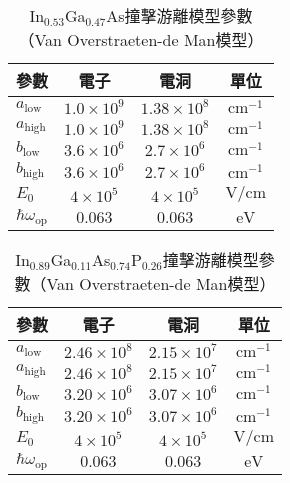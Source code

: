 \begin{table}[h]
\begin{center}
\caption[In$_{0.53}$Ga$_{0.47}$As撞擊游離模型參數]{In$_{0.53}$Ga$_{0.47}$As撞擊游離模型參數（Van Overstraeten-de Man模型）\cite{pearsall1980impact}} \label{t:ii-InGaAs-Van-Overstraeten-parameter}
\begin{tabular}{lccc}
\hline
 參數 &	電子	&	電洞		&	單位	\\
\hline
$a_\text{low}$	&	$1.0\times10^9$	&	$1.38\times10^8$	&	$\mathrm{cm}^{-1}$	\\
$a_\text{high}$	&	$1.0\times10^9$	&	$1.38\times10^8$	&	$\mathrm{cm}^{-1}$	\\
$b_\text{low}$	&	$3.6\times10^6$	&	$2.7\times10^6$	&	$\mathrm{cm}^{-1}$	\\
$b_\text{high}$	&	$3.6\times10^6$	&	$2.7\times10^6$	&	$\mathrm{cm}^{-1}$	\\
$E_0$	&	$4\times10^5$	&	$4\times10^5$	&	$\mathrm{V}/\mathrm{cm}$	\\
$\hbar\omega_\text{op}$	&	$0.063$	&	$0.063$	&	$\mathrm{eV}$	\\
\hline

\end{tabular}
\end{center}
\end{table}

\begin{table}[h]
\begin{center}
\caption[In$_{0.89}$Ga$_{0.11}$As$_{0.74}$P$_{0.26}$撞擊游離模型參數]{In$_{0.89}$Ga$_{0.11}$As$_{0.74}$P$_{0.26}$撞擊游離模型參數（Van Overstraeten-de Man模型）\cite{takanashi1979ionization}} \label{t:ii-InGaAsP-Van-Overstraeten-parameter}
\begin{tabular}{lccc}
\hline
 參數 &	電子	&	電洞		&	單位	\\
\hline
$a_\text{low}$	&	$2.46\times10^8$	&	$2.15\times10^7$	&	$\mathrm{cm}^{-1}$	\\
$a_\text{high}$	&	$2.46\times10^8$	&	$2.15\times10^7$	&	$\mathrm{cm}^{-1}$	\\
$b_\text{low}$	&	$3.20\times10^6$	&	$3.07\times10^6$	&	$\mathrm{cm}^{-1}$	\\
$b_\text{high}$	&	$3.20\times10^6$	&	$3.07\times10^6$	&	$\mathrm{cm}^{-1}$	\\
$E_0$	&	$4\times10^5$	&	$4\times10^5$	&	$\mathrm{V}/\mathrm{cm}$	\\
$\hbar\omega_\text{op}$	&	$0.063$	&	$0.063$	&	$\mathrm{eV}$	\\
\hline

\end{tabular}
\end{center}
\end{table}

